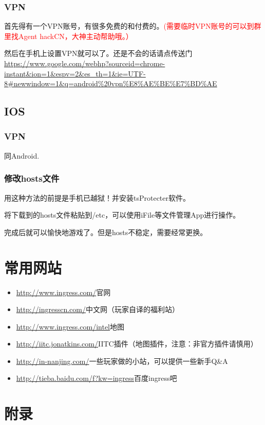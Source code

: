 \documentclass[a4paper]{article}
\begin{document}
\subsubsection{VPN}
首先得有一个VPN账号，有很多免费的和付费的。\textcolor{red}{(需要临时VPN账号的可以到群里找Agent hackCN，大神主动帮助哦。）}\par
然后在手机上设置VPN就可以了。还是不会的话请点传送门\\
\url{https://www.google.com/webhp?sourceid=chrome-instant&ion=1&espv=2&es_th=1&ie=UTF-8#newwindow=1&q=android\%20vpn\%E8\%AE\%BE\%E7\%BD\%AE}

\subsection{IOS}
\subsubsection{VPN}
同Android.

\subsubsection{修改hosts文件}
用这种方法的前提是手机已越狱！并安装tsProtecter软件。\par
将下载到的hosts文件粘贴到/etc，可以使用iFile等文件管理App进行操作。\par
完成后就可以愉快地游戏了。但是hosts不稳定，需要经常更换。

\section{常用网站}
\begin{itemize}
\item \url{http://www.ingress.com/}官网~
\item \url{http://ingresscn.com/}中文网（玩家自译的福利站）
\item \url{http://www.ingress.com/intel}地图
\item \url{http://iitc.jonatkins.com/}IITC插件（地图插件，注意：非官方插件请慎用）
\item \url{http://in-nanjing.com/}一些玩家做的小站，可以提供一些新手Q\&A
\item \url{http://tieba.baidu.com/f?kw=ingress}百度ingress吧

\end{itemize}

\section{附录}
\end{document}

